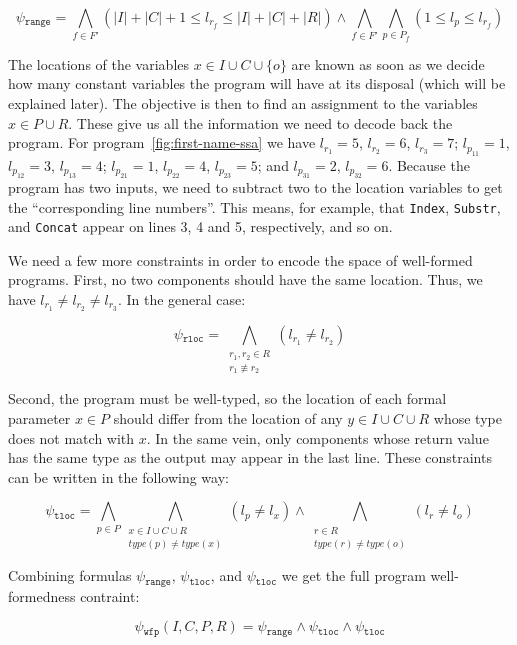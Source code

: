\[
  \psi{}_{\mathtt{range}} =
  \bigwedge_{f \in F'} (|I| + |C| + 1 \leq l_{r_f} \leq |I| + |C| + |R|)
  \wedge \bigwedge_{f \in F'}\bigwedge_{p \in P_f} (1 \leq l_p \leq l_{r_f})
\]

The locations of the variables $x \in I \cup C \cup \{o\}$ are known as soon as
we decide how many constant variables the program will have at its disposal
(which will be explained later). The objective is then to find an assignment to
the variables $x \in P \cup R$. These give us all the information we need to
decode back the program. For program~\ref{fig:first-name-ssa} we have $l_{r_1} =
5$, $l_{r_2} = 6$, $l_{r_3} = 7$; $l_{p_{11}} = 1$, $l_{p_{12}} = 3$,
$l_{p_{13}} = 4$; $l_{p_{21}} = 1$, $l_{p_{22}} = 4$, $l_{p_{23}} = 5$; and
$l_{p_{31}} = 2$, $l_{p_{32}} = 6$. Because the program has two inputs, we need
to subtract two to the location variables to get the ``corresponding line
numbers''. This means, for example, that \lstinline{Index}, \lstinline{Substr},
and \lstinline{Concat} appear on lines 3, 4 and 5, respectively, and so on.

We need a few more constraints in order to encode the space of well-formed
programs. First, no two components should have the same location. Thus,
we have $l_{r_1} \neq l_{r_2} \neq l_{r_3}$. In the general case:

\[
  \psi{}_{\mathtt{rloc}} =
  \bigwedge_{\substack{r_1, r_2 \in R\\ r_1 \not\equiv r_2}} (l_{r_1} \neq l_{r_2}) 
\]

\noindent
Second, the program must be well-typed, so the location of each formal parameter
$x \in P$ should differ from the location of any $y \in I \cup C \cup R$ whose
type does not match with $x$. In the same vein, only components whose return
value has the same type as the output may appear in the last line. These
constraints can be written in the following way:

\[
  \psi{}_{\mathtt{tloc}} =
  \bigwedge_{p \in P}\bigwedge_{\substack{x \in I \cup C \cup R \\ type(p) \neq type(x)}} (l_p \neq l_x)
  \wedge \bigwedge_{\substack{r \in R \\ type(r) \neq type(o)}} (l_r \neq l_o)
\]

Combining formulas $\psi{}_{\mathtt{range}}$, $\psi{}_{\mathtt{tloc}}$, and
$\psi{}_{\mathtt{tloc}}$ we get the full program well-formedness contraint:

\[
  \psi{}_{\mathtt{wfp}}(I, C, P, R) =
  \psi{}_{\mathtt{range}} \wedge \psi{}_{\mathtt{tloc}} \wedge \psi{}_{\mathtt{tloc}}
\]


